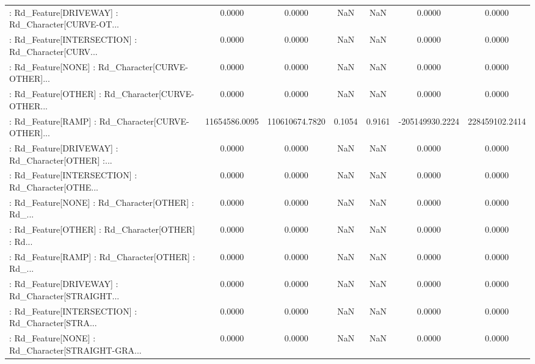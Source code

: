 \begin{longtable}{p{4cm}cccccc}
 : Rd\_Feature[DRIVEWAY] : Rd\_Character[CURVE-OT... &            0.0000 &            0.0000 &     NaN &          NaN &             0.0000 &            0.0000 \\
 : Rd\_Feature[INTERSECTION] : Rd\_Character[CURV... &            0.0000 &            0.0000 &     NaN &          NaN &             0.0000 &            0.0000 \\
 : Rd\_Feature[NONE] : Rd\_Character[CURVE-OTHER]... &            0.0000 &            0.0000 &     NaN &          NaN &             0.0000 &            0.0000 \\
 : Rd\_Feature[OTHER] : Rd\_Character[CURVE-OTHER... &            0.0000 &            0.0000 &     NaN &          NaN &             0.0000 &            0.0000 \\
 : Rd\_Feature[RAMP] : Rd\_Character[CURVE-OTHER]... &     11654586.0095 &    110610674.7820 &  0.1054 &       0.9161 &    -205149930.2224 &    228459102.2414 \\
 : Rd\_Feature[DRIVEWAY] : Rd\_Character[OTHER] :... &            0.0000 &            0.0000 &     NaN &          NaN &             0.0000 &            0.0000 \\
 : Rd\_Feature[INTERSECTION] : Rd\_Character[OTHE... &            0.0000 &            0.0000 &     NaN &          NaN &             0.0000 &            0.0000 \\
 : Rd\_Feature[NONE] : Rd\_Character[OTHER] : Rd\_... &            0.0000 &            0.0000 &     NaN &          NaN &             0.0000 &            0.0000 \\
 : Rd\_Feature[OTHER] : Rd\_Character[OTHER] : Rd... &            0.0000 &            0.0000 &     NaN &          NaN &             0.0000 &            0.0000 \\
 : Rd\_Feature[RAMP] : Rd\_Character[OTHER] : Rd\_... &            0.0000 &            0.0000 &     NaN &          NaN &             0.0000 &            0.0000 \\
 : Rd\_Feature[DRIVEWAY] : Rd\_Character[STRAIGHT... &            0.0000 &            0.0000 &     NaN &          NaN &             0.0000 &            0.0000 \\
 : Rd\_Feature[INTERSECTION] : Rd\_Character[STRA... &            0.0000 &            0.0000 &     NaN &          NaN &             0.0000 &            0.0000 \\
 : Rd\_Feature[NONE] : Rd\_Character[STRAIGHT-GRA... &            0.0000 &            0.0000 &     NaN &          NaN &             0.0000 &            0.0000 \\

\end{longtable}
